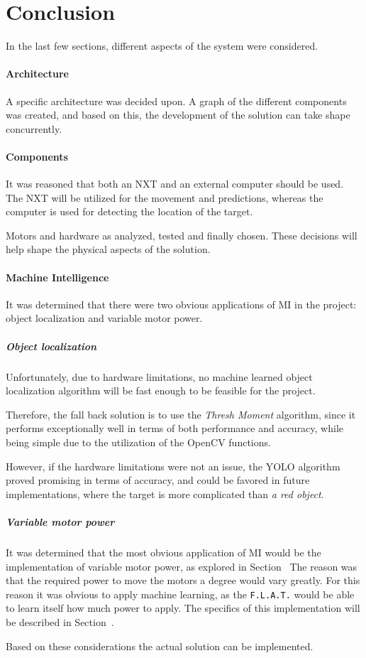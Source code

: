 \section{Conclusion}
In the last few sections, different aspects of the system were considered.

\paragraph{Architecture}
A specific architecture was decided upon.
A graph of the different components was created, and based on this, the development of the solution can take shape concurrently.


\paragraph{Components}
It was reasoned that both an NXT and an external computer should be used.
The NXT will be utilized for the movement and predictions, whereas the computer is used for detecting the location of the target.


Motors and hardware as analyzed, tested and finally chosen.
These decisions will help shape the physical aspects of the solution.


\paragraph{Machine Intelligence}
It was determined that there were two obvious applications of MI in the project: object localization and variable motor power.

\subparagraph{Object localization}
Unfortunately, due to hardware limitations, no machine learned object localization algorithm will be fast enough to be feasible for the project.

Therefore, the fall back solution is to use the \textit{Thresh Moment} algorithm, since it performs exceptionally well in terms of both performance and accuracy, while being simple due to the utilization of the OpenCV functions.

However, if the hardware limitations were not an issue, the YOLO algorithm proved promising in terms of accuracy, and could be favored in future implementations, where the target is more complicated than \textit{a red object}.

\subparagraph{Variable motor power}
It was determined that the most obvious application of MI would be the implementation of variable motor power, as explored in Section~
The reason was that the required power to move the motors a degree would vary greatly.
For this reason it was obvious to apply machine learning, as the \texttt{F.L.A.T.} would be able to learn itself how much power to apply.
The specifics of this implementation will be described in Section~.


Based on these considerations the actual solution can be implemented.
